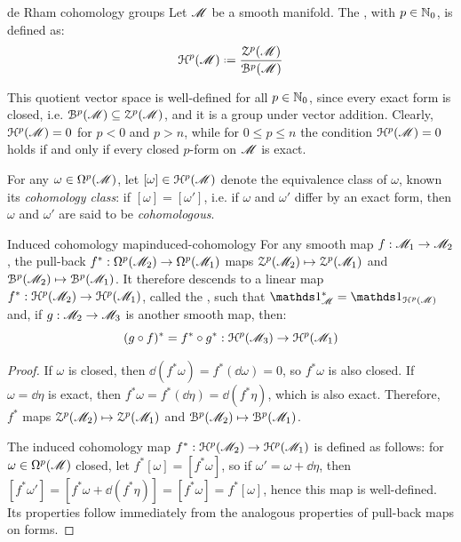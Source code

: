 \begin{definition}{de Rham cohomology groups}{}
  Let $ \mathscr{M} $ be a smooth manifold. The , with $ p \in \mathbb{N}_0 $, is defined as:
  \begin{equation}
    \hp{p}(\man) \defeq \frac{\zp{p}(\man)}{\bp{p}(\man)}
  \end{equation}
\end{definition}

This quotient vector space is well-defined for all $ p \in \mathbb{N}_0 $, since every exact form is closed, i.e. $ \EuScript{B}^{p}(\mathscr{M}) \subseteq \EuScript{Z}^{p}(\mathscr{M}) $, and it is a group under vector addition. Clearly, $ \EuScript{H}^{p}(\mathscr{M}) = 0 $ for $ p < 0 $ and $ p > n $, while for $ 0 \leq p \leq n $ the condition $ \EuScript{H}^{p}(\mathscr{M}) = 0 $ holds if and only if every closed $ p $-form on $ \mathscr{M} $ is exact.

For any $ \omega \in \Omega^{p}(\mathscr{M}) $, let $ [\omega] \in \EuScript{H}^{p}(\mathscr{M}) $ denote the equivalence class of $ \omega $, known its \emph{cohomology class}: if $ [\omega] = [\omega'] $, i.e. if $ \omega $ and $ \omega' $ differ by an exact form, then $ \omega $ and $ \omega' $ are said to be \emph{cohomologous}.

\begin{proposition}{Induced cohomology map}{induced-cohomology}
  For any smooth map $ f : \mathscr{M}_1 \rightarrow \mathscr{M}_2 $, the pull-back $ f^* : \Omega^{p}(\mathscr{M}_2) \rightarrow \Omega^{p}(\mathscr{M}_1) $ maps $ \EuScript{Z}^{p}(\mathscr{M}_2) \mapsto \EuScript{Z}^{p}(\mathscr{M}_1) $ and $ \EuScript{B}^{p}(\mathscr{M}_2) \mapsto \EuScript{B}^{p}(\mathscr{M}_1) $. It therefore descends to a linear map $ f^* : \EuScript{H}^{p}(\mathscr{M}_2) \rightarrow \EuScript{H}^{p}(\mathscr{M}_1) $, called the , such that $ \id_\man^* = \id_{\hp{p}(\man)} $ and, if $ g : \mathscr{M}_2 \rightarrow \mathscr{M}_3 $ is another smooth map, then:
  \begin{equation*}
    (g \circ f)^* = f^* \circ g^* : \EuScript{H}^{p}(\mathscr{M}_3) \rightarrow \EuScript{H}^{p}(\mathscr{M}_1)
  \end{equation*}
\end{proposition}

\begin{proofbox}
  \begin{proof}
    If $ \omega $ is closed, then $ \dd (f^*\omega) = f^*(\dd \omega) = 0 $, so $ f^*\omega $ is also closed. If $ \omega = \dd \eta $ is exact, then $ f^*\omega = f^*(\dd \eta) = \dd (f^*\eta) $, which is also exact. Therefore, $ f^* $ maps $ \EuScript{Z}^{p}(\mathscr{M}_2) \mapsto \EuScript{Z}^{p}(\mathscr{M}_1) $ and $ \EuScript{B}^{p}(\mathscr{M}_2) \mapsto \EuScript{B}^{p}(\mathscr{M}_1) $.

    The induced cohomology map $ f^* : \EuScript{H}^{p}(\mathscr{M}_2) \rightarrow \EuScript{H}^{p}(\mathscr{M}_1) $ is defined as follows: for $ \omega \in \Omega^{p}(\mathscr{M}) $ closed, let $ f^*[\omega] = [f^*\omega] $, so if $ \omega' = \omega + \dd \eta $, then $ [f^*\omega'] = [f^*\omega + \dd (f^*\eta)] = [f^*\omega] = f^*[\omega] $, hence this map is well-defined. Its properties follow immediately from the analogous properties of pull-back maps on forms.
  \end{proof}
\end{proofbox}

